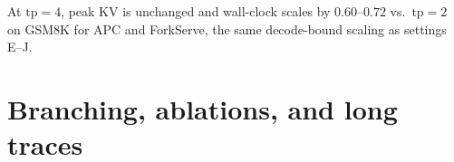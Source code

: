 \documentclass[11pt,a4paper]{article}
\begin{document}
\begin{table}[h]
\centering
\small
{}
\caption{Last-line answer stop, $n{=}32$, $\mathrm{tp}{=}2$.
GSM8K peak is $1093/1493{=}0.73$, $1085/1485{=}0.73$, and $1121/1521{=}0.74$ of APC.
ForkServe+ decode tokens are $0.77\times$, $0.31\times$, and $0.41\times$ APC.
DeepSeek-R1 ForkServe+ scores $18/32$, above APC.
Llama-3-8B stays within one problem of APC; Mistral-7B loses five problems.
Game24 peaks are $0.58\times$, $0.60\times$, and $0.56\times$ APC.
Success stays at most $1/32$ because $D{=}256$ does not finish an equation.
Llama-3-8B Game24 emits $32$ decode tokens on every system (immediate EOS).}
\end{table}

At $\mathrm{tp}{=}4$, peak KV is unchanged and wall-clock scales by $0.60$--$0.72$ vs.\ $\mathrm{tp}{=}2$ on GSM8K for APC and ForkServe, the same decode-bound scaling as settings E--J.

\section{Branching, ablations, and long traces}
\label{sec:sens}
\end{document}
